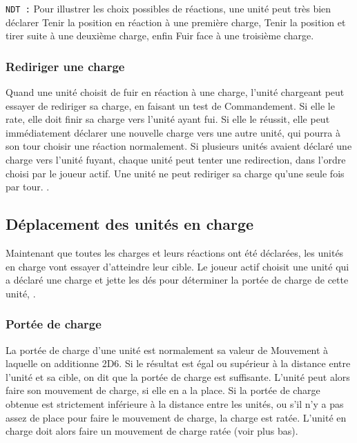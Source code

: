 \texttt{NDT :} Pour illustrer les choix possibles de réactions, une unité peut très bien déclarer Tenir la position en réaction à une première charge, Tenir la position et tirer suite à une deuxième charge, enfin Fuir face à une troisième charge.

\subsubsection*{Rediriger une charge}

Quand une unité choisit de fuir en réaction à une charge, l'unité chargeant peut essayer de rediriger sa charge, en faisant un test de Commandement. Si elle le rate, elle doit finir sa charge vers l'unité ayant fui. Si elle le réussit, elle peut immédiatement déclarer une nouvelle charge vers une autre unité, qui pourra à son tour choisir une réaction normalement. Si plusieurs unités avaient déclaré une charge vers l'unité fuyant, chaque unité peut tenter une redirection, dans l'ordre choisi par le joueur actif. Une unité ne peut rediriger sa charge qu'une seule fois par tour. .

\subsection{Déplacement des unités en charge}

Maintenant que toutes les charges et leurs réactions ont été déclarées, les unités en charge vont essayer d'atteindre leur cible. Le joueur actif choisit une unité qui a déclaré une charge et jette les dés pour déterminer la portée de charge de cette unité, .

\subsubsection*{Portée de charge}

La portée de charge d'une unité est normalement sa valeur de Mouvement à laquelle on additionne 2D6. Si le résultat est égal ou supérieur à la distance entre l'unité et sa cible, on dit que la portée de charge est suffisante. L'unité peut alors faire son mouvement de charge, si elle en a la place. Si la portée de charge obtenue est strictement inférieure à la distance entre les unités, ou s'il n'y a pas assez de place pour faire le mouvement de charge, la charge est ratée. L'unité en charge doit alors faire un mouvement de charge ratée (voir plus bas).

